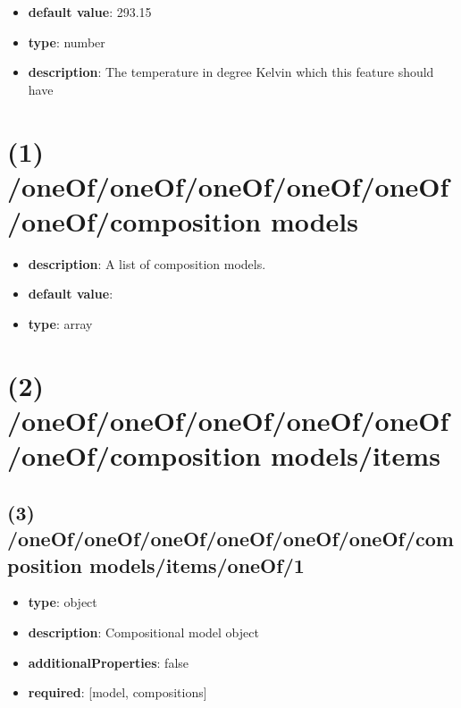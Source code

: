 \begin{itemize}[leftmargin=4em]\item {\bf default value}: 293.15
\item {\bf type}: number
\item {\bf description}: The temperature in degree Kelvin which this feature should have
\end{itemize}\section{(1) /oneOf/oneOf/oneOf/oneOf/oneOf/oneOf/composition models}
\begin{itemize}[leftmargin=1em]\item {\bf description}: A list of composition models.
\item {\bf default value}: 
\item {\bf type}: array
\end{itemize}\section{(2) /oneOf/oneOf/oneOf/oneOf/oneOf/oneOf/composition models/items}

\subsection{(3) /oneOf/oneOf/oneOf/oneOf/oneOf/oneOf/composition models/items/oneOf/1}
\begin{itemize}[leftmargin=3em]\item {\bf type}: object
\item {\bf description}: Compositional model object
\item {\bf additionalProperties}: false
\item {\bf required}: [model, compositions]\end{itemize}
